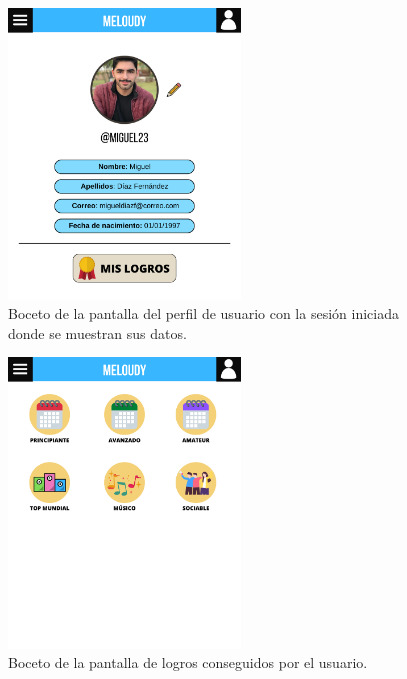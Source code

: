 \begin{figure}[H]
    \centering
    \centerline{\includegraphics[width=0.55\textwidth, frame]{imagenes/c6/2.png}}
    \caption{Boceto de la pantalla del perfil de usuario con la sesión iniciada donde se muestran sus datos.}
    \label{fig:perfil}
    
    
\end{figure}


\begin{figure}[H]
    \centering
    \centerline{\includegraphics[width=0.55\textwidth, frame]{imagenes/c6/3.png}}
    \caption{Boceto de la pantalla de logros conseguidos por el usuario.}
    \label{fig:logros}
    
    
\end{figure}


